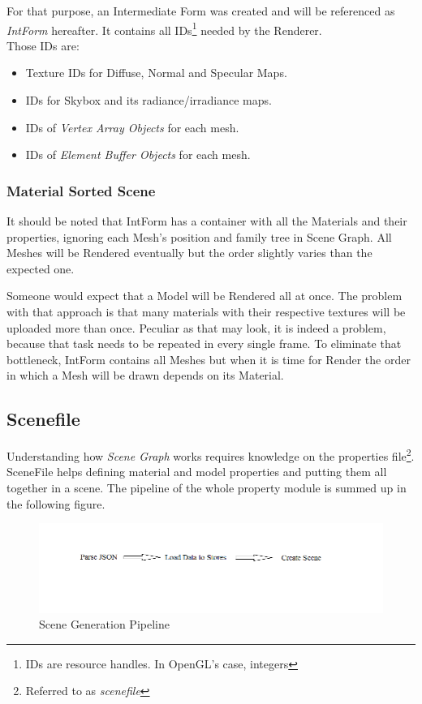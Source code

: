 For that purpose, an Intermediate Form was created and will be referenced as \textit{IntForm} hereafter. It contains
all IDs\footnote{IDs are resource handles. In OpenGL's case, integers} needed by the Renderer.\\
Those IDs are:

\begin{itemize}
\item Texture IDs for Diffuse, Normal and Specular Maps.
\item IDs for Skybox and its radiance/irradiance maps.
\item IDs of \textit{Vertex Array Objects} for each mesh. 
\item IDs of \textit{Element Buffer Objects} for each mesh.
\end{itemize}

\subsubsection{Material Sorted Scene}
It should be noted that IntForm has a container with all the Materials and their properties, ignoring each Mesh's
position and family tree in Scene Graph. All Meshes will be Rendered eventually but the order slightly varies than
the expected one.

Someone would expect that a Model will be Rendered all at once. The problem with that approach is that many materials
with their respective textures will be uploaded more than once. Peculiar as that may look, it is indeed a problem,
because that task needs to be repeated in every single frame. To eliminate that bottleneck, IntForm contains all
Meshes but when it is time for Render the order in which a Mesh will be drawn depends on its Material.

\subsection{Scenefile}
Understanding how \textit{Scene Graph} works requires knowledge on the properties file\footnote{Referred to as
\textit{scenefile}}. SceneFile helps defining material and model properties and putting them all together in a scene.
The pipeline of the whole property module is summed up in the following figure.

\begin{figure}[h]
    \centering
    \includegraphics[scale=0.5, clip=true, trim=0 80 0 20]{./image/scene_pipeline.png}
    \caption{Scene Generation Pipeline}
\end{figure}

